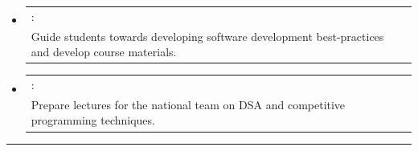 \documentclass[a4paper,11pt]{article}
\makeatletter
\newcommand{\resumePOR}[3]{
\vspace{0.5mm}\item[]
    \begin{tabular*}{\textwidth}[t]{l@{\extracolsep{\fill}}r}
    \hspace{-3mm}{#1}:\hspace{1mm} & \hspace*{0pt}\hfill{\footnotesize{ #3}} \vspace{-0.5mm}\\ \hspace{-2.9mm}#2 
    \end{tabular*}
    \vspace{0mm}
}
\newcommand{\resumeSubHeadingListStart}{\begin{itemize}[leftmargin=*,labelsep=0mm,itemsep=-2.5mm]}
\newcommand{\resumeSubHeadingListEnd}{\end{itemize}\vspace{-2mm}}
\makeatother
\begin{document}


\resumeSubHeadingListStart

\resumePOR{\textbf{Software Construction Undergraduate TA, MIT}}
{Guide students towards developing software development best-practices and develop course materials.}
{\raisebox{0.75pt}{Jan 2026 - Present}}

\vspace{0.5mm}

\resumePOR{\textbf{Team Trainer and Problem Setter, Dominican Informatics Olympiad (ODI)}} %
{Prepare lectures for the national team on DSA and competitive programming techniques.}{\raisebox{0.75pt}{2021 - Present}}

\vspace{-1mm}
\resumeSubHeadingListEnd
\hspace*{-2mm}\rule{1.030\textwidth}{0.1mm}
\vspace{0mm}

\end{document}
